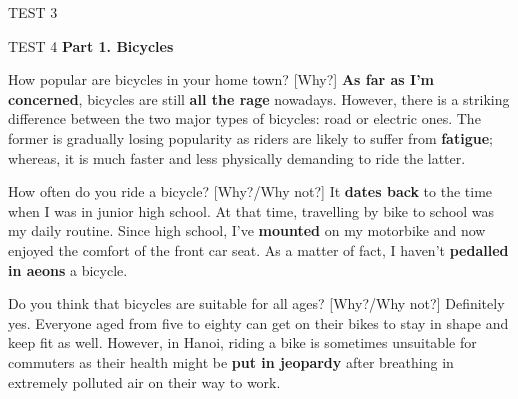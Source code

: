 \begin{glossarymc}[Cambridge 9]
\begin{test}{TEST 3}
\begin{VocabHighlights}
    \end{VocabHighlights}
    \end{test}

    \begin{test}{TEST 4}
    \noindent
    \textbf{Part 1. Bicycles}
    \begin{qa}{How popular are bicycles in your home town? [Why?]}
    \textbf{As far as I'm concerned}, bicycles are still \textbf{all the rage} nowadays. However, there is a striking difference between the two major types of bicycles: road or electric ones. The former is gradually losing popularity as riders are likely to suffer from \textbf{fatigue}; whereas, it is much faster and less physically demanding to ride the latter.
    \end{qa}

    \begin{qa}{How often do you ride a bicycle? [Why?/Why not?]}
    It \textbf{dates back} to the time when I was in junior high school. At that time, travelling by bike to school was my daily routine. Since high school, I've \textbf{mounted} on my motorbike and now enjoyed the comfort of the front car seat. As a matter of fact, I haven't \textbf{pedalled in aeons} a bicycle.
    \end{qa}

    \begin{qa}{Do you think that bicycles are suitable for all ages? [Why?/Why not?]}
    Definitely yes. Everyone aged from five to eighty can get on their bikes to stay in shape and keep fit as well. However, in Hanoi, riding a bike is sometimes unsuitable for commuters as their health might be \textbf{put in jeopardy} after breathing in extremely polluted air on their way to work.
    \end{qa}


\end{test}
\end{glossarymc}
